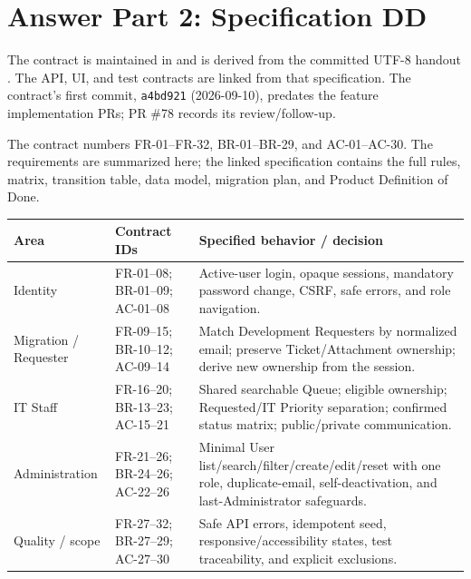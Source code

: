 \documentclass[10pt,a4paper]{article}
\begin{document}
\section{Answer Part 2: Specification DD}

The contract is maintained in
\href{https://github.com/ovenmakemeheat/toktickit/blob/eddafe67d6fd8d742b98d4673a731b25540cc57d/docs/lab-03/specification.md}{}
and is derived from the committed UTF-8 handout
\href{https://github.com/ovenmakemeheat/toktickit/blob/eddafe67d6fd8d742b98d4673a731b25540cc57d/docs/lab-03/requirements/UTF-8_Lab_3_sheet.pdf}{}.
The API, UI, and test contracts are linked from that specification. The
contract's first commit, \texttt{a4bd921} (2026-09-10), predates the feature
implementation PRs; PR \#78 records its review/follow-up.

The contract numbers FR-01--FR-32, BR-01--BR-29, and AC-01--AC-30. The
requirements are summarized here; the linked specification contains the full
rules, matrix, transition table, data model, migration plan, and Product
Definition of Done.

\begin{center}\small
\begin{tabularx}{\linewidth}{@{}p{30mm}p{34mm}Y@{}}
\toprule
Area & Contract IDs & Specified behavior / decision \\
\midrule
Identity & FR-01--08; BR-01--09; AC-01--08 & Active-user login, opaque sessions, mandatory password change, CSRF, safe errors, and role navigation. \\
Migration / Requester & FR-09--15; BR-10--12; AC-09--14 & Match Development Requesters by normalized email; preserve Ticket/Attachment ownership; derive new ownership from the session. \\
IT Staff & FR-16--20; BR-13--23; AC-15--21 & Shared searchable Queue; eligible ownership; Requested/IT Priority separation; confirmed status matrix; public/private communication. \\
Administration & FR-21--26; BR-24--26; AC-22--26 & Minimal User list/search/filter/create/edit/reset with one role, duplicate-email, self-deactivation, and last-Administrator safeguards. \\
Quality / scope & FR-27--32; BR-27--29; AC-27--30 & Safe API errors, idempotent seed, responsive/accessibility states, test traceability, and explicit exclusions. \\
\bottomrule
\end{tabularx}
\end{center}
\end{document}
